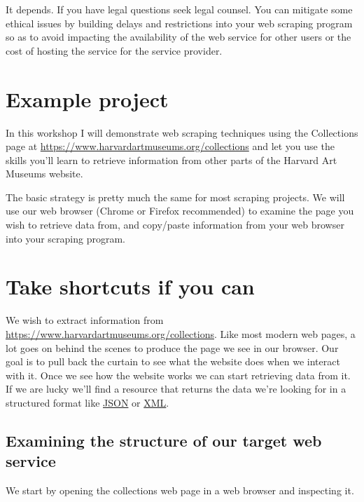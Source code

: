 \documentclass[]{book}
\begin{document}
It depends. If you have legal questions seek legal counsel. You can
mitigate some ethical issues by building delays and restrictions into
your web scraping program so as to avoid impacting the availability of
the web service for other users or the cost of hosting the service for
the service provider.

\section{Example project}\label{example-project-1}

In this workshop I will demonstrate web scraping techniques using the
Collections page at \url{https://www.harvardartmuseums.org/collections}
and let you use the skills you'll learn to retrieve information from
other parts of the Harvard Art Museums website.

The basic strategy is pretty much the same for most scraping projects.
We will use our web browser (Chrome or Firefox recommended) to examine
the page you wish to retrieve data from, and copy/paste information from
your web browser into your scraping program.

\section{Take shortcuts if you can}\label{take-shortcuts-if-you-can}

We wish to extract information from
\url{https://www.harvardartmuseums.org/collections}. Like most modern
web pages, a lot goes on behind the scenes to produce the page we see in
our browser. Our goal is to pull back the curtain to see what the
website does when we interact with it. Once we see how the website works
we can start retrieving data from it. If we are lucky we'll find a
resource that returns the data we're looking for in a structured format
like \href{https://json.org/}{JSON} or
\href{https://en.wikipedia.org/wiki/XML}{XML}.

\subsection{Examining the structure of our target web
service}\label{examining-the-structure-of-our-target-web-service}

We start by opening the collections web page in a web browser and
inspecting it.
\end{document}
